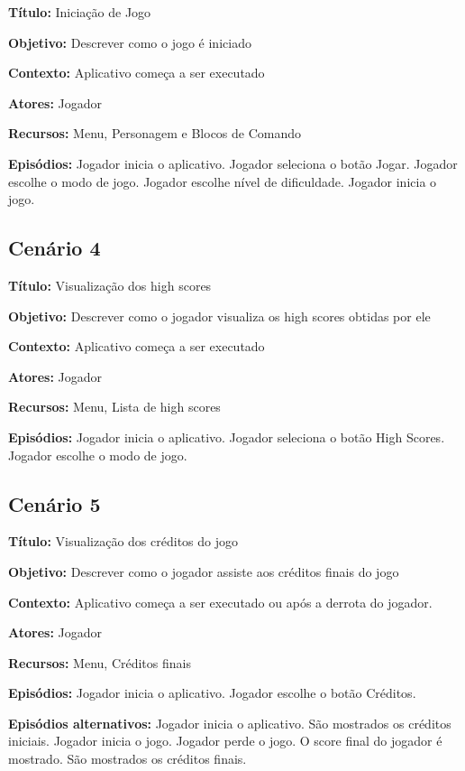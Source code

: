 \textbf{Título:} Iniciação de Jogo

\textbf{Objetivo:} Descrever como o jogo é iniciado

\textbf{Contexto:} Aplicativo começa a ser executado 

\textbf{Atores:} Jogador

\textbf{Recursos:} Menu, Personagem e Blocos de Comando

\textbf{Episódios:} Jogador inicia o aplicativo. Jogador seleciona o botão Jogar. Jogador escolhe o modo de jogo. Jogador escolhe nível de dificuldade. Jogador inicia o jogo.

\subsection{Cenário 4}

\textbf{Título:} Visualização dos high scores

\textbf{Objetivo:} Descrever como o jogador visualiza os high scores obtidas por ele

\textbf{Contexto:} Aplicativo começa a ser executado

\textbf{Atores:} Jogador

\textbf{Recursos:} Menu, Lista de high scores

\textbf{Episódios:} Jogador inicia o aplicativo. Jogador seleciona o botão High Scores. Jogador escolhe o modo de jogo.

\subsection{Cenário 5}

\textbf{Título:} Visualização dos créditos do jogo

\textbf{Objetivo:} Descrever como o jogador assiste aos créditos finais do jogo

\textbf{Contexto:} Aplicativo começa a ser executado ou após a derrota do jogador.

\textbf{Atores:} Jogador

\textbf{Recursos:} Menu, Créditos finais

\textbf{Episódios:} Jogador inicia o aplicativo. Jogador escolhe o botão Créditos.

\textbf{Episódios alternativos:} Jogador inicia o aplicativo. São mostrados os créditos iniciais. Jogador inicia o jogo. Jogador perde o jogo. O score final do jogador é mostrado. São mostrados os créditos finais.

